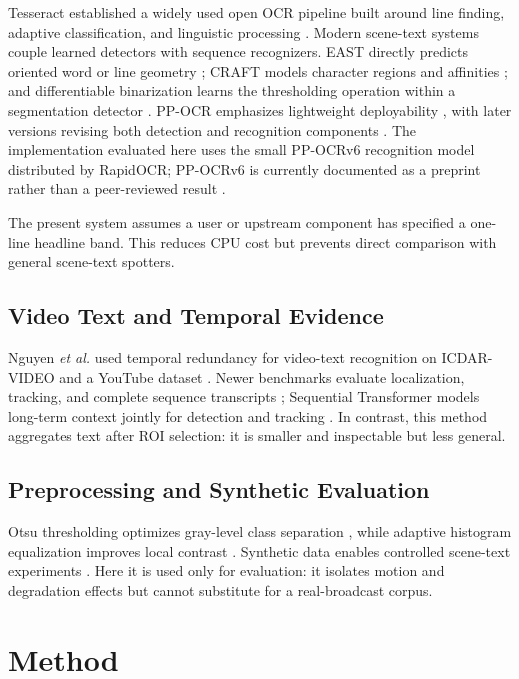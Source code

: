 \documentclass[conference]{IEEEtran}
\begin{document}
Tesseract established a widely used open OCR pipeline built around line finding, adaptive
classification, and linguistic processing \cite{smith2007tesseract}.  Modern scene-text systems
couple learned detectors with sequence recognizers.  EAST directly predicts oriented word or
line geometry \cite{zhou2017east}; CRAFT models character regions and affinities
\cite{baek2019craft}; and differentiable binarization learns the thresholding operation within a
segmentation detector \cite{liao2020db}.  PP-OCR emphasizes lightweight deployability
\cite{du2020ppocr}, with later versions revising both detection and recognition components
\cite{li2022ppocrv3}.  The implementation evaluated here uses the small PP-OCRv6 recognition
model distributed by RapidOCR; PP-OCRv6 is currently documented as a preprint rather than a
peer-reviewed result \cite{zhang2026ppocrv6,rapidocr2026}.

The present system assumes a user or upstream component has specified a one-line headline band.
This reduces CPU cost but prevents direct comparison with general scene-text spotters.

\subsection{Video Text and Temporal Evidence}

Nguyen \emph{et al.} used temporal redundancy for video-text recognition on ICDAR-VIDEO and a
YouTube dataset \cite{nguyen2014video}.  Newer benchmarks evaluate localization, tracking, and
complete sequence transcripts \cite{cheng2021svts}; Sequential Transformer models long-term
context jointly for detection and tracking \cite{zhang2024sequential}.  In contrast, this method
aggregates text after ROI selection: it is smaller and inspectable but less general.

\subsection{Preprocessing and Synthetic Evaluation}

Otsu thresholding optimizes gray-level class separation \cite{otsu1979threshold}, while adaptive
histogram equalization improves local contrast \cite{pizer1987adaptive}.  Synthetic data enables
controlled scene-text experiments \cite{gupta2016synthetic}.  Here it is used only for evaluation:
it isolates motion and degradation effects but cannot substitute for a real-broadcast corpus.

\section{Method}
\end{document}

